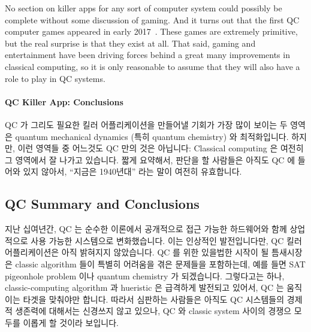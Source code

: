 No section on killer apps for any sort of computer system could possibly
be complete without some discussion of gaming.
And it turns out that the first QC computer games appeared in early
2017~\cite{JamesWootton2017IBMQEgame,JamesWootton2017IBMQEbattleship}.
These games are extremely primitive, but the real surprise is that
they exist at all.
That said, gaming and entertainment have been driving forces
behind a great many improvements in classical computing, so it is
only reasonable to assume that they will also have a role to play
in QC systems.
\fi

\paragraph{QC Killer App: Conclusions}
\label{sec:future:QC Killer App: Conclusions}

QC 가 그리도 필요한 킬러 어플리케이션을 만들어낼 기회가 가장 많이 보이는 두
영역은 quantum mechanical dynamics (특히 quantum chemistry) 와 최적화입니다.
하지만, 이런 영역들 중 어느것도 QC 만의 것은 아닙니다: Classical computing 은
여전히 그 영역에서 잘 나가고 있습니다.
짧게 요약해서, 판단을 할 사람들은 아직도 QC 에 들어와 있지 않아서, ``지금은
1940년대'' 라는 말이 여전히 유효합니다.

\subsection{QC Summary and Conclusions}
\label{sec:future:QC Summary and Conclusions}

지난 십여년간, QC 는 순수한 이론에서 공개적으로 접근 가능한 하드웨어와 함께
상업적으로 사용 가능한 시스템으로 변화했습니다.
이는 인상적인 발전입니다만, QC 킬러 어플리케이션은 아직 밝혀지지 않았습니다.
QC 를 위한 있을법한 시작이 될 틈새시장은 classic algorithm 들이 특별히 어려움을
겪은 문제들을 포함하는데, 예를 들면 SAT pigeonhole problem 이나 quantum
chemistry 가 되겠습니다.  그렇다고는 하나, classic-computing algorithm 과
hueristic 은 급격하게 발전되고 있어서, QC 는 움직이는 타겟을 맞춰야만 합니다.
따라서 심판하는 사람들은 아직도 QC 시스템들의 경제적 생존력에 대해서는 신경쓰지
않고 있으나, QC 와 classic system 사이의 경쟁으 모두를 이롭게 할 것이라
보입니다.
\iffalse

